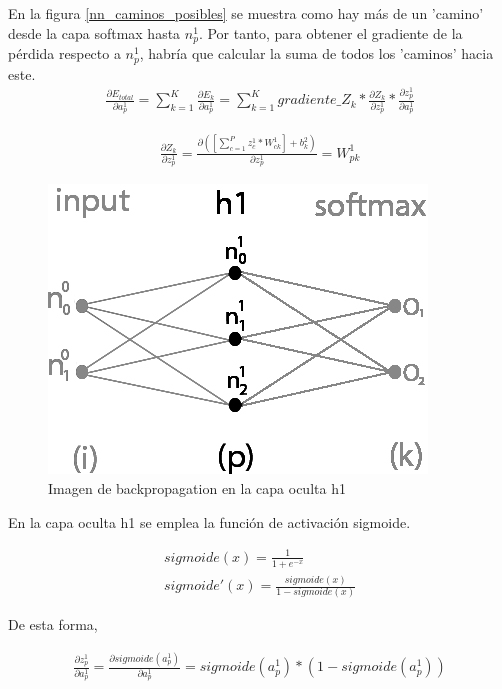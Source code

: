 En la figura \ref{nn_caminos_posibles} se muestra como hay más de un 'camino' desde la capa softmax hasta $n^1_p$. Por tanto, para obtener el gradiente de la pérdida respecto a $n^1_p$, habría que calcular la suma de todos los 'caminos' hacia este. \\

\begin{gather}
	\frac{\partial E_{total}}{\partial a^1_p} = \sum_{k=1}^K \frac{\partial E_k}{\partial a^1_p} = \sum_{k=1}^K  gradiente\_Z_k * \frac{\partial Z_k}{\partial z^1_p} * \frac{\partial z^1_p}{\partial a^1_p}
	\label{E_total_a1p}
\end{gather}

\begin{gather}
	\frac{\partial Z_k}{\partial z^1_p} = \frac{\partial( [\sum_{c=1}^{P} z^1_c * W^1_{ck}] + b^2_k)}{\partial z^1_p} = W^1_{pk}
	\label{deriv_Zk_z1p}
\end{gather}

\begin{figure}[H]
	\centering
	\includegraphics[scale=0.35]{imagenes/nn_1_capa_h1.jpg}  
	\caption{Imagen de backpropagation en la capa oculta h1}
	\label{fig:nn_1_capa_h1}
\end{figure}

En la capa oculta h1 se emplea la función de activación sigmoide. 

\begin{gather}
	sigmoide(x) = \frac{1}{1+e^{-x}} \\
	sigmoide'(x) = \frac{sigmoide(x)}{1-sigmoide(x)}
\end{gather}

De esta forma,

\begin{gather}
	\frac{\partial z^1_ p}{\partial a^1_p} = \frac{\partial sigmoide(a^1_p)}{\partial a^1_p} = sigmoide(a^1_p)*(1-sigmoide(a^1_p))
	\label{deriv_z1p_a1p}
\end{gather}

